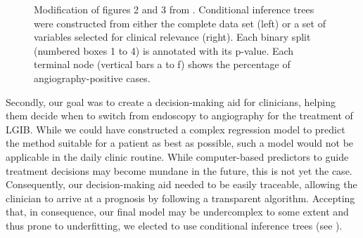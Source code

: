 \begin{figure}[b!]
\centering
\caption{Modification of figures 2 and 3 from \citet{Werner2021}. Conditional
  inference trees were constructed from either the complete data set (left) or 
  a set of variables selected for clinical relevance (right). Each binary 
  split (numbered boxes 1 to 4) is annotated with its p-value. Each terminal 
  node (vertical bars a to f) shows the percentage of angiography-positive 
  cases.}
\label{fig:angiotree}
\end{figure}

Secondly, our goal was to create a decision-making aid for clinicians, helping
them decide when to switch from endoscopy to angiography for the treatment of
LGIB. While we could have constructed a complex regression model to predict
the method suitable for a patient as best as possible, such a model would not
be applicable in the daily clinic routine. While computer-based predictors to
guide treatment decisions may become mundane in the future, this is not yet
the case. Consequently, our decision-making aid needed to be easily traceable,
allowing the clinician to arrive at a prognosis by following a transparent
algorithm. Accepting that, in consequence, our final model may be undercomplex
to some extent and thus prone to underfitting, we elected to use conditional
inference trees (see ).

